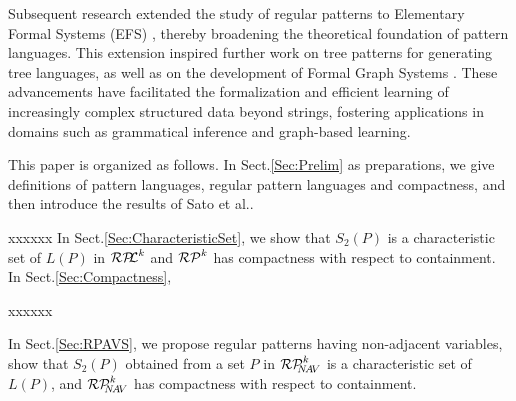 %
%
Subsequent research extended the study of regular patterns to Elementary Formal Systems (EFS) \cite{Arikawa1992}, thereby broadening the theoretical foundation of pattern languages. This extension inspired further work on tree patterns \cite{Arimura1997,Suzuki2006} for generating tree languages, as well as on the development of Formal Graph Systems \cite{Uchida1994}. These advancements have facilitated the formalization and efficient learning of increasingly complex structured data beyond strings, fostering applications in domains such as grammatical inference and graph-based learning.
%

This paper is organized as follows.
In Sect.\ref{Sec:Prelim} as preparations, we give definitions of pattern languages, regular pattern languages and compactness, and then introduce the results of Sato et al.\cite{Sato1}.

xxxxxx
In Sect.\ref{Sec:CharacteristicSet}, we show that $S_{2}(P)$ is a characteristic set of $L(P)$ in $\mathcal{RP\!\!L}^{k}$ and $\mathcal{RP}^{k}$ has compactness with respect to containment.
In Sect.\ref{Sec:Compactness}, 

xxxxxx

In Sect.\ref{Sec:RPAVS}, we propose regular patterns having non-adjacent variables, show that $S_2(P)$ obtained from a set $P$ in $\mathcal{RP}^{k}_{\!\!\!N\!A\!V}$ is a characteristic set of $L(P)$, and $\mathcal{RP}^{k}_{\!\!\!N\!A\!V}$ has compactness with respect to containment.

